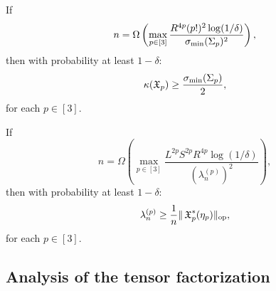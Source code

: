 

\begin{lemma}
\label{lem:lowRankLower}
If $$n = \Omega \left(\max_{p\in [3]} \frac{R^{4p} (p!)^2 \log(1/\delta)}{\sigma_\text{\rm min}(\Sigma_p)^2} \right),$$
then with probability at least $1-\delta$:
$$\kappa(\operatorname{\mathfrak{X}}_p) \ge \frac{\sigma_\text{\rm min}(\Sigma_p)}{2},$$
for each $p \in [3]$.
\end{lemma}


\begin{lemma}
\label{lem:lowRankUpper}
If $$n = \Omega \left(\max_{p\in [3]} \frac{L^{2p} S^{2p} R^{4p} \log(1/\delta)}{\left(\lambda_n^{(p)}\right)^2} \right),$$
then with probability at least $1-\delta$:
$$\lambda_n^{(p)} \ge \frac1{n} \|\operatorname{\mathfrak{X}}_p^*(\eta_p)\|_{\text{\rm op}},$$
for each $p \in [3]$.
\end{lemma}

\subsection{Analysis of the tensor factorization} 
\label{sec:tensorError}

